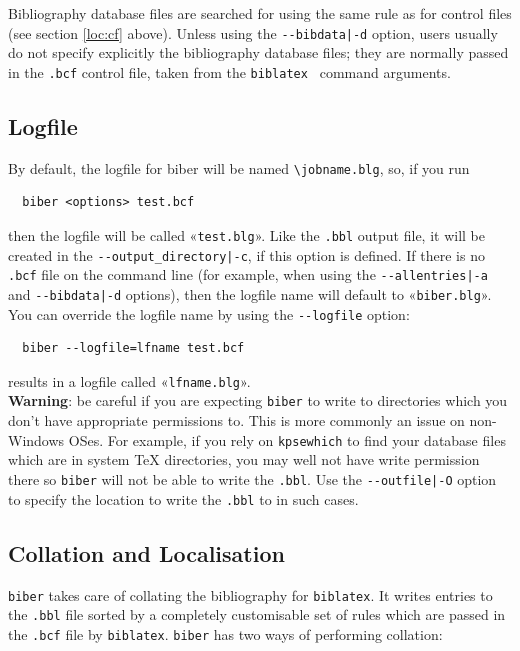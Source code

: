 \documentclass{ltxdockit}
\begin{document}
Bibliography database files are searched for using the same rule as for
control files (see section \ref{loc:cf} above). Unless using the
\verb+--bibdata|-d+ option, users usually do not specify explicitly the
bibliography database files; they are normally passed in the \verb+.bcf+
control file, taken from the \verb+biblatex + \verb++
command arguments.

\subsection{Logfile}

By default, the logfile for biber will be named \verb+\jobname.blg+,
so, if you run

\begin{verbatim}
  biber <options> test.bcf
\end{verbatim}

\noindent then the logfile will be called «\verb+test.blg+». Like the
\verb+.bbl+ output file, it will be created in the
\verb+--output_directory|-c+, if this option is defined. If there is
no \verb+.bcf+ file on the command line (for example, when using the
\verb+--allentries|-a+ and \verb+--bibdata|-d+ options), then the
logfile name will default to «\verb+biber.blg+». You can
override the logfile name by using the \verb+--logfile+ option:

\begin{verbatim}
  biber --logfile=lfname test.bcf
\end{verbatim}

\noindent results in a logfile called «\verb+lfname.blg+».\\

\noindent \textbf{Warning}: be careful if you are expecting \verb+biber+ to
write to directories which you don't have appropriate permissions to. This
is more commonly an issue on non-Windows OSes. For example, if you rely on
\verb+kpsewhich+ to find your database files which are in system TeX
directories, you may well not have write permission there so \verb+biber+
will not be able to write the \verb+.bbl+. Use the \verb+--outfile|-O+
option to specify the location to write the \verb+.bbl+ to in such cases.

\subsection{Collation and Localisation}\label{coll}

\verb+biber+ takes care of collating the bibliography for
\verb+biblatex+. It writes entries to the \verb+.bbl+ file sorted by a
completely customisable set of rules which are passed in the
\verb+.bcf+ file by \verb+biblatex+. \verb+biber+ has two ways of performing
collation:\\[2ex]
\end{document}
